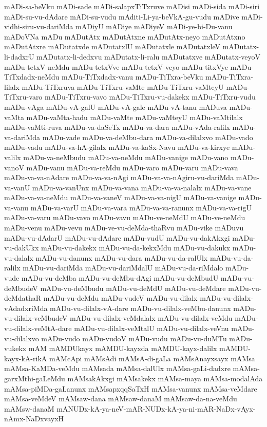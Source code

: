 {mADi-sa-beVku
mADi-sade
mADi-salapxTiTxruve
mADisi
mADi-sida
mADi-siri
mADi-su-vu-dAdare
mADi-su-vudu
mAditi-Li-ya-beVkA-gu-vudu
mADive
mADi-vidhi-siru-vu-dariMda
mADiyU
mADiye
mADiyeV
mADi-ye-bi-Du-vanu
mADoVNa
mADu
mADutAtx
mADutAtxne
mADutAtx-neyo
mADutAtxno
mADutAtxre
mADutatxde
mADutatxlU
mADutatxle
mADutatxleV
mADutatx-li-dadxrU
mADutatx-li-dedxvu
mADutatx-li-ralu
mADutatxve
mADutatx-veyoV
mADu-tetxV-neMdu
mADu-tetxVve
mADu-tetxV-veyo
mADu-titxVye
mADu-TiTxdadx-neMdu
mADu-TiTxdadx-vanu
mADu-TiTxra-beVku
mADu-TiTxra-lilalx
mADu-TiTxruva
mADu-TiTxru-vaMte
mADu-TiTxru-vaMteyU
mADu-TiTxru-varo
mADu-TiTxru-vavo
mADu-TiTxru-vu-dakekx
mADu-TiTxru-vudu
mADu-vAga
mADu-vA-galU
mADu-vA-gale
mADu-vA-tanu
mADuva
mADu-vaMta
mADu-vaMta-hadu
mADu-vaMte
mADu-vaMteyU
mADu-vaMtilalx
mADu-vaMti-ruva
mADu-va-daSeTx
mADu-va-dara
mADu-vAda-ralilx
mADu-va-dariMda
mADu-vade
mADu-va-deMbu-dara
mADu-va-dilalxvo
mADu-vado
mADu-vadu
mADu-va-hA-gilalx
mADu-va-kaSx-Navu
mADu-va-kirxye
mADu-valilx
mADu-va-neMbudu
mADu-va-neMdu
mADu-vanige
mADu-vano
mADu-vanoV
mADu-vanu
mADu-va-reMdu
mADu-varo
mADu-varu
mADu-vava
mADu-va-va-nAdare
mADu-va-va-nAgi
mADu-va-va-nAgiru-vu-dariMda
mADu-va-vanU
mADu-va-vanUnx
mADu-va-vana
mADu-va-va-nalalx
mADu-va-vane
mADu-va-va-neMdu
mADu-va-vaneV
mADu-va-va-nigU
mADu-va-vanige
mADu-va-vanu
mADu-va-varU
mADu-va-vara
mADu-va-va-ranunx
mADu-va-va-rigU
mADu-va-varu
mADu-vavo
mADu-vavu
mADu-ve-neMdU
mADu-ve-neMdu
mADu-venu
mADu-vevu
mADu-ve-vu-deMda-thaRvu
mADu-vike
mADuvu
mADu-vu-dAdarU
mADu-vu-dAdare
mADu-vudU
mADu-vu-dakAkxgi
mADu-vu-dakUkx
mADu-vu-dakekx
mADu-vu-da-kekxMdu
mADu-vu-dakukx
mADu-vu-dalalx
mADu-vu-danunx
mADu-vu-dara
mADu-vu-da-ralUlx
mADu-vu-da-ralilx
mADu-vu-dariMda
mADu-vu-dariMdalU
mADu-vu-da-riMdalo
mADu-vude
mADu-vu-deMba
mADu-vu-deMbu-dAgi
mADu-vu-deMbudU
mADu-vu-deMbudeV
mADu-vu-deMbudu
mADu-vu-deMdU
mADu-vu-deMdare
mADu-vu-deMdathaR
mADu-vu-deMdu
mADu-vudeV
mADu-vu-dilalx
mADu-vu-dilalx-vAdadxriMda
mADu-vu-dilalx-vA-dare
mADu-vu-dilalx-veMbu-danunx
mADu-vu-dilalx-veMbudeV
mADu-vu-dilalx-veMdalalx
mADu-vu-dilalx-veMdu
mADu-vu-dilalx-veMtA-dare
mADu-vu-dilalx-veMtalU
mADu-vu-dilalx-veVnu
mADu-vu-dilalxvo
mADu-vudo
mADu-vudoV
mADu-vudu
mADu-vu-duMTu
mADu-vukekx
mAM
mAMDUkayx
mAMDU-kayxda
mAMDU-kayx-dalilx
mAMDU-kayx-kA-rikA
mAMcApi
mAMsAdi
mAMsA-di-gaLa
mAMsAnayxsayx
mAMsa
mAMsa-KaMDa-veMdu
mAMsada
mAMsa-dalUlx
mAMsa-gaLi-dadxre
mAMsa-garxMthi-gaLeMdu
mAMsakAkxgi
mAMsakekx
mAMsa-maya
mAMsa-modalAda
mAMsa-piMDa-gaLanunx
mAMsapxqqSaTxH
mAMsa-vanunx
mAMsa-veMdare
mAMsa-veMdeV
mAMsaw-dana
mAMsaw-danaM
mAMsaw-da-na-veMdu
mAMsw-danaM
mANUDx-kA-ya-neV-mAR-NUDx-kA-ya-ni-mAR-NaDx-vAyx-nAmx-NaDxvayxH
}
